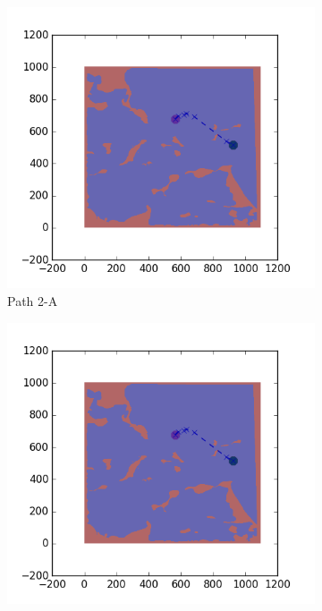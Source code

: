 \documentclass{tamuccthesis}
\begin{document}
\begin{figure}
\begin{subfigure}[b]{0.24\textwidth}
        \includegraphics[width=\textwidth,trim={4cm 3cm 2cm 3cm},clip]{EXP3RG_PathBa_-1_-1_0d01_0d005.png}
        \caption{Path 2-A}
        \label{fig:Path_2-A_upReward_upWork_b}
    \end{subfigure}
    \begin{subfigure}[b]{0.24\textwidth}
        \centering
        \includegraphics[width=\textwidth,trim={4cm 3cm 2cm 3cm},clip]{EXP3RG_PathBa_-1_-1_0d01_0d005.png}

\end{subfigure}
\end{figure}
\end{document}
